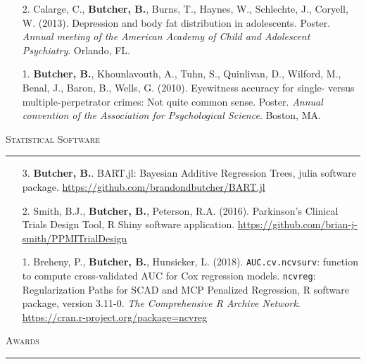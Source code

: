 \documentclass[a4paper]{article}
\begin{document}
\begin{enumerate}
  \item[2.] Calarge, C., \textbf{Butcher, B.}, Burns, T., Haynes, W., Schlechte,
    J., Coryell, W. (2013). Depression and body fat distribution in adolescents.
    Poster. \textit{Annual meeting of the American Academy of Child and Adolescent
    Psychiatry}. Orlando, FL.

  \item[1.] \textbf{Butcher, B.}, Khounlavouth, A., Tuhn, S., Quinlivan, D.,
    Wilford, M., Benal, J., Baron, B., Wells, G. (2010). Eyewitness accuracy for
    single- versus multiple-perpetrator crimes: Not quite common sense. Poster.
    \textit{Annual convention of the Association for Psychological Science}.
    Boston, MA.

\end{enumerate}

\begin{flushleft}
  \Large\textsc{Statistical Software}
  \textcolor{usafagrey}{\rule[0.5\baselineskip]{\textwidth}{0.75pt}}
\end{flushleft}
\vspace{-1.5\baselineskip}

\begin{enumerate}
  \item[3.] \textbf{Butcher, B.}. BART.jl: Bayesian
    Additive Regression Trees, julia software package.
    \url{https://github.com/brandondbutcher/BART.jl}
  \item[2.] Smith, B.J., \textbf{Butcher, B.}, Peterson, R.A. (2016).
    Parkinson's Clinical Trials Design Tool, R Shiny software application.
    \url{https://github.com/brian-j-smith/PPMITrialDesign}
  \item[1.] Breheny, P., \textbf{Butcher, B.}, Hunsicker, L. (2018).
    \texttt{AUC.cv.ncvsurv}: function to compute cross-validated
    AUC for Cox regression models. \texttt{ncvreg}: Regularization Paths for SCAD
    and MCP Penalized Regression, R software package, version 3.11-0.
    \textit{The Comprehensive R Archive Network}.
    \url{https://cran.r-project.org/package=ncvreg}
\end{enumerate}


\begin{flushleft}
  \Large\textsc{Awards}
  \textcolor{usafagrey}{\rule[0.5\baselineskip]{\textwidth}{0.75pt}}
\end{flushleft}
\vspace{-\baselineskip}
\end{document}
